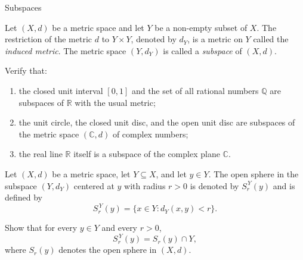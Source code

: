 \documentclass[12pt, a4paper]{article}
\begin{document}
\FrontPage
\Large


\begin{heading}
    Subspaces
\end{heading}

\vspace{10pt}

\begin{definition}
Let $(X,d)$ be a metric space and let $Y$ be a non-empty subset of $X$.
The restriction of the metric $d$ to $Y\times Y$, denoted by $d_Y$, is a metric on $Y$
called the \emph{induced metric}. The metric space $(Y,d_Y)$ is called a
\emph{subspace} of $(X,d)$.
\end{definition}

\vspace{100pt}

\begin{problem}
Verify that:
\begin{enumerate}
    \item the closed unit interval $[0,1]$ and the set of all rational numbers $\mathbb{Q}$
    are subspaces of $\mathbb{R}$ with the usual metric;
    \item the unit circle, the closed unit disc, and the open unit disc are subspaces of
    the metric space $(\mathbb{C},d)$ of complex numbers;
    \item the real line $\mathbb{R}$ itself is a subspace of the complex plane $\mathbb{C}$.
\end{enumerate}
\end{problem}

\clearpage

\begin{definition}
Let $(X,d)$ be a metric space, let $Y\subseteq X$, and let $y\in Y$.
The open sphere in the subspace $(Y,d_Y)$ centered at $y$ with radius $r>0$ is denoted by
$S_r^{\,Y}(y)$ and is defined by
\[
S_r^{\,Y}(y)=\{x\in Y : d_Y(x,y)<r\}.
\]
\end{definition}

\vspace{100pt}

\begin{problem}
Show that for every $y\in Y$ and every $r>0$,
\[
S_r^{\,Y}(y)=S_r(y)\cap Y,
\]
where $S_r(y)$ denotes the open sphere in $(X,d)$.
\end{problem}


\clearpage
\end{document}
